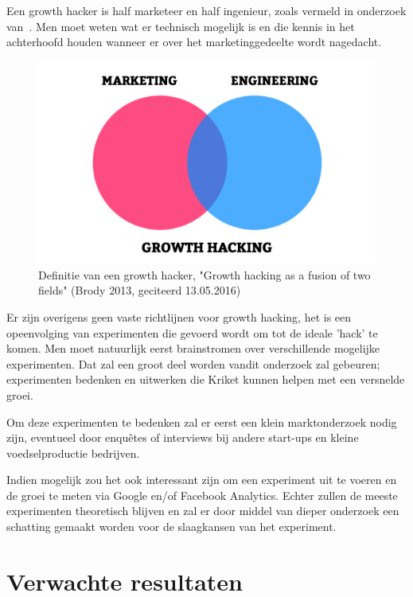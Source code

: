 Een growth hacker is half marketeer en half ingenieur, zoals vermeld in onderzoek van~\textcite{Lee2016}. Men moet weten wat er technisch mogelijk is en die kennis in het achterhoofd houden wanneer er over het marketinggedeelte wordt nagedacht. 

\begin{figure}[h!]
	\includegraphics[width=\linewidth]{growth-hacker-definition.jpg}
	\caption{Definitie van een growth hacker, "Growth hacking as a fusion of two fields"  (Brody 2013, geciteerd 13.05.2016)}
	\label{fig:defGrowthHacker}
\end{figure}

Er zijn overigens geen vaste richtlijnen voor growth hacking, het is een opeenvolging van experimenten die gevoerd wordt om tot de ideale 'hack' te komen. Men moet natuurlijk eerst brainstromen over verschillende mogelijke experimenten. Dat zal een groot deel worden vandit onderzoek zal gebeuren; experimenten bedenken en uitwerken die Kriket kunnen helpen met een versnelde groei.

Om deze experimenten te bedenken zal er eerst een klein marktonderzoek nodig zijn, eventueel door enquêtes of interviews bij andere start-ups en kleine voedselproductie bedrijven. 

Indien mogelijk zou het ook interessant zijn om een experiment uit te voeren en de groei te meten via Google en/of Facebook Analytics. Echter zullen de meeste experimenten theoretisch blijven en zal er door middel van dieper onderzoek een schatting gemaakt worden voor de slaagkansen van het experiment.

\section{Verwachte resultaten}
\label{sec:verwachte_resultaten}

